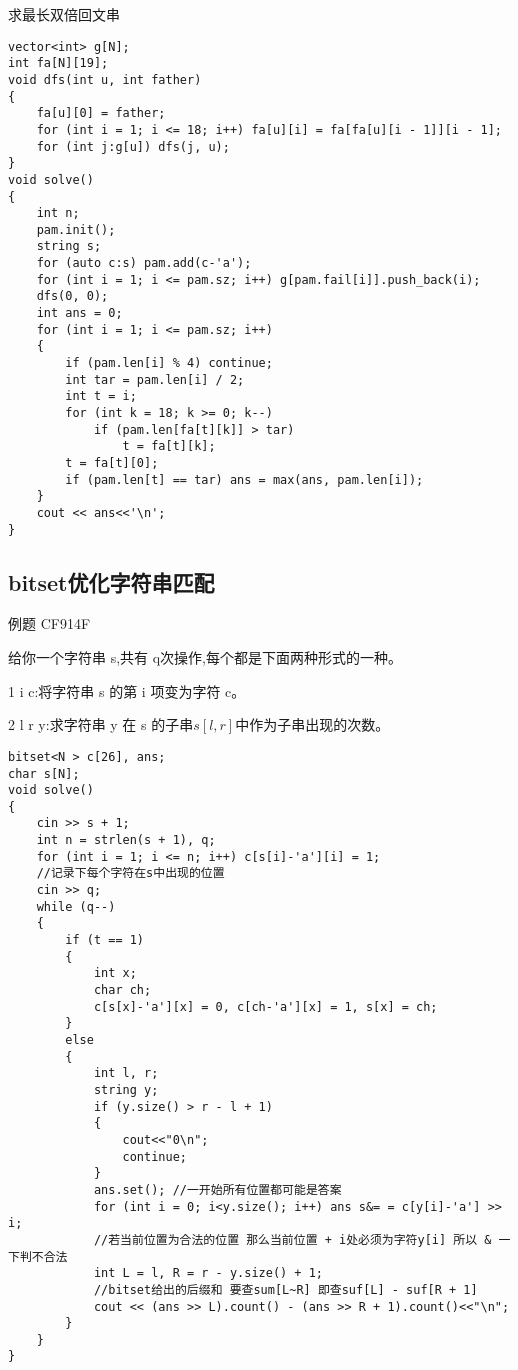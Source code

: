 \documentclass[a4paper, fontset=none]{ctexart}
\begin{document}
求最长双倍回文串

\begin{verbatim}
vector<int> g[N];
int fa[N][19];
void dfs(int u, int father)
{
    fa[u][0] = father;
    for (int i = 1; i <= 18; i++) fa[u][i] = fa[fa[u][i - 1]][i - 1];
    for (int j:g[u]) dfs(j, u);
}
void solve()
{
    int n;
    pam.init();
    string s;
    for (auto c:s) pam.add(c-'a');
    for (int i = 1; i <= pam.sz; i++) g[pam.fail[i]].push_back(i);
    dfs(0, 0);
    int ans = 0;
    for (int i = 1; i <= pam.sz; i++)
    {
        if (pam.len[i] % 4) continue;
        int tar = pam.len[i] / 2;
        int t = i;
        for (int k = 18; k >= 0; k--)
            if (pam.len[fa[t][k]] > tar)
                t = fa[t][k];
        t = fa[t][0];
        if (pam.len[t] == tar) ans = max(ans, pam.len[i]);
    }
    cout << ans<<'\n';
}
\end{verbatim}
\subsection{bitset优化字符串匹配}

例题 CF914F

给你一个字符串 s,共有 q次操作,每个都是下面两种形式的一种。

1 i c:将字符串 s 的第 i 项变为字符 c。

2 l r y:求字符串 y 在 s 的子串$s [l , r]$中作为子串出现的次数。

\begin{verbatim}
bitset<N > c[26], ans;
char s[N];
void solve()
{
    cin >> s + 1;
    int n = strlen(s + 1), q;
    for (int i = 1; i <= n; i++) c[s[i]-'a'][i] = 1;
    //记录下每个字符在s中出现的位置
    cin >> q;
    while (q--)
    {
        if (t == 1)
        {
            int x;
            char ch;
            c[s[x]-'a'][x] = 0, c[ch-'a'][x] = 1, s[x] = ch;
        }
        else
        {
            int l, r;
            string y;
            if (y.size() > r - l + 1)
            {
                cout<<"0\n";
                continue;
            }
            ans.set(); //一开始所有位置都可能是答案
            for (int i = 0; i<y.size(); i++) ans s&= = c[y[i]-'a'] >> i;
            //若当前位置为合法的位置 那么当前位置 + i处必须为字符y[i] 所以 & 一下判不合法
            int L = l, R = r - y.size() + 1;
            //bitset给出的后缀和 要查sum[L~R] 即查suf[L] - suf[R + 1]
            cout << (ans >> L).count() - (ans >> R + 1).count()<<"\n";
        }
    }
}
\end{verbatim}
\end{document}
